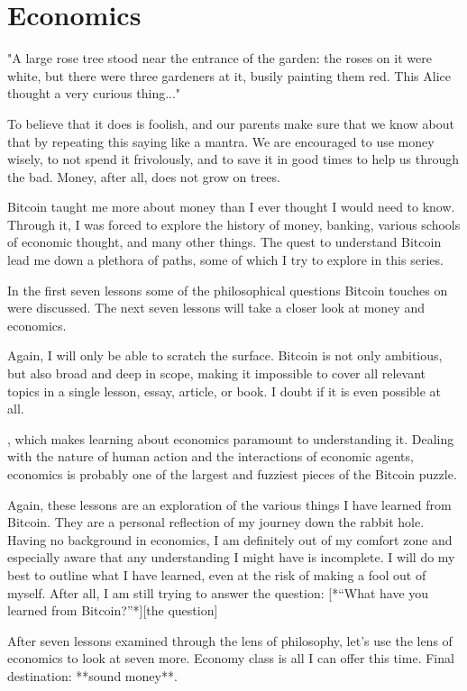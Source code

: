 \chapter{Economics}
\label{ch:economics}

"A large rose tree stood near the entrance of the garden: the roses on it were white, but there were three gardeners at it, busily painting them red. This Alice thought a very curious thing..."

 To believe that it does is foolish, and our
parents make sure that we know about that by repeating this saying like a
mantra. We are encouraged to use money wisely, to not spend it frivolously,
and to save it in good times to help us through the bad. Money, after all,
does not grow on trees.

Bitcoin taught me more about money than I ever thought I would need to know.
Through it, I was forced to explore the history of money, banking, various
schools of economic thought, and many other things. The quest to understand
Bitcoin lead me down a plethora of paths, some of which I try to explore in
this series.

In the first seven lessons some of the philosophical questions Bitcoin touches
on were discussed. The next seven lessons will take a closer look at money and
economics.


Again, I will only be able to scratch the surface. Bitcoin is not only
ambitious, but also broad and deep in scope, making it impossible to cover all
relevant topics in a single lesson, essay, article, or book. I  doubt if it is
even possible at all.

, which makes learning about
economics paramount to understanding it. Dealing with the nature of human action
and the interactions of economic agents, economics is probably one of the
largest and fuzziest pieces of the Bitcoin puzzle.

Again, these lessons are an exploration of the various things I have learned
from Bitcoin. They are a personal reflection of my journey down the rabbit hole.
Having no background in economics, I am definitely out of my comfort zone and
especially aware that any understanding I might have is incomplete. I will do my
best to outline what I have learned, even at the risk of making a fool out of
myself. After all, I am still trying to answer the question: [*“What have you
learned from Bitcoin?”*][the question]

After seven lessons examined through the lens of philosophy, let’s use the lens
of economics to look at seven more. Economy class is all I can offer this time.
Final destination: **sound money**.

